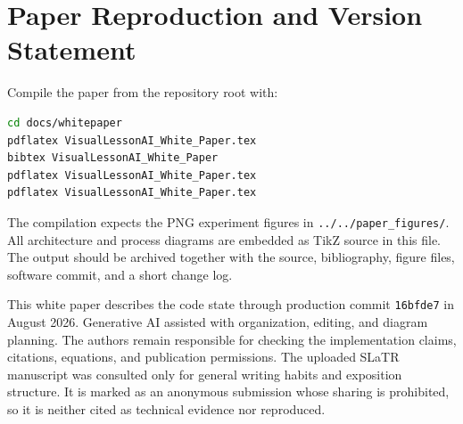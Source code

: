 \documentclass[11pt]{article}
\newcommand{\code}[1]{\texttt{#1}}
\theoremstyle{plain}
\theoremstyle{definition}
\begin{document}
\section{Paper Reproduction and Version Statement}

Compile the paper from the repository root with:
\begin{lstlisting}[language=bash]
cd docs/whitepaper
pdflatex VisualLessonAI_White_Paper.tex
bibtex VisualLessonAI_White_Paper
pdflatex VisualLessonAI_White_Paper.tex
pdflatex VisualLessonAI_White_Paper.tex
\end{lstlisting}
The compilation expects the PNG experiment figures in \code{../../paper\_figures/}. All architecture and process diagrams are embedded as TikZ source in this file. The output should be archived together with the source, bibliography, figure files, software commit, and a short change log.

This white paper describes the code state through production commit \code{16bfde7} in August 2026. Generative AI assisted with organization, editing, and diagram planning. The authors remain responsible for checking the implementation claims, citations, equations, and publication permissions. The uploaded SLaTR manuscript was consulted only for general writing habits and exposition structure. It is marked as an anonymous submission whose sharing is prohibited, so it is neither cited as technical evidence nor reproduced.



\end{document}
